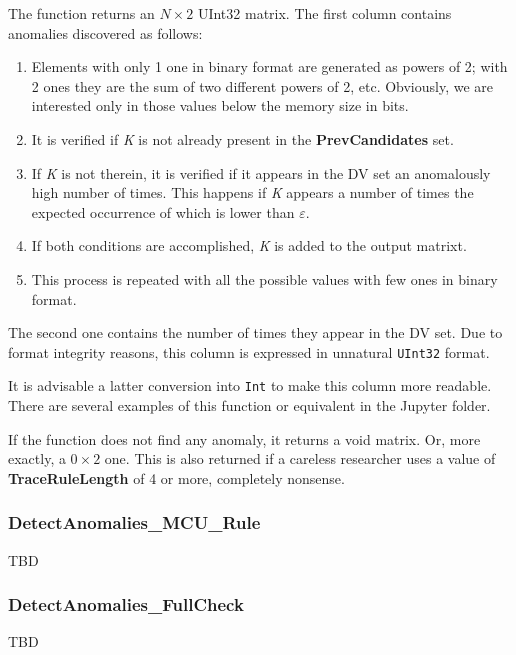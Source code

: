 \begin{itemize}
\begin{itemize}
	 \end{itemize}
	 
	 The function returns an \(N\times 2\) UInt32 matrix. The first column contains anomalies discovered as follows:
	 
	 \begin{enumerate}
	 	\item Elements with only 1 one in binary format are generated as powers of 2; with 2 ones they are the sum of two different powers of 2, etc. Obviously, we are interested only in those values below the memory size in bits.
	 	\item It is verified if \textit{K} is not already present in the \textbf{PrevCandidates} set.
	 	\item If \textit{K} is not therein, it is verified if it appears in the DV set an anomalously high number of times. This happens if \textit{K} appears a number of times the expected occurrence of which is lower than \textbf{\(\varepsilon\)}.
	 	\item If both conditions are accomplished, \textit{K} is added to the output matrixt.
	 	\item This process is repeated with all the possible values with few ones in binary format.
	 \end{enumerate}
	 
	 The second one contains the number of times they appear in the DV set. Due to format integrity reasons, this column is expressed in unnatural \texttt{UInt32} format. 
	 
	 It is advisable a latter conversion into \texttt{Int} to make this column more readable. There are several examples of this function or equivalent in the Jupyter folder.
	 
	 If the function does not find any anomaly, it returns a void matrix.  Or, more exactly, a \(0\times 2\) one. This is also returned if a careless researcher uses a value of \textbf{TraceRuleLength} of 4 or more, completely nonsense.
	 
\end{itemize}
 \subsubsection*{DetectAnomalies\_MCU\_Rule}\label{Fun:DetectAnomaliesMCURule}
 TBD
 \subsubsection*{DetectAnomalies\_FullCheck}\label{Fun:DetectAnomaliesFullCheck}
 TBD
